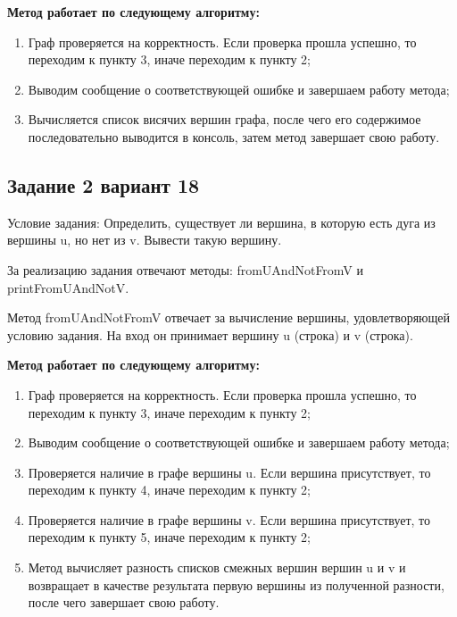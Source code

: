 \documentclass[bachelor, och, pract]{SCWorks}
\begin{document}
\textbf{Метод работает по следующему алгоритму:}

\begin{enumerate}
  \item {Граф проверяется на корректность. Если проверка прошла успешно,
  то переходим к пункту 3, иначе переходим к пункту 2;}
  \item {Выводим сообщение о соответствующей ошибке и завершаем работу метода;}
  \item {Вычисляется список висячих вершин графа, после чего его содержимое
  последовательно выводится в консоль, затем метод завершает свою работу.}
\end{enumerate}


\bigskip

\subsection{Задание 2 вариант 18}

Условие задания: Определить, существует ли вершина, в которую есть дуга из вершины u, но нет из v. Вывести такую вершину.
\bigskip

За реализацию задания отвечают методы: fromUAndNotFromV и printFromUAndNotV.
\bigskip

Метод fromUAndNotFromV отвечает за вычисление вершины, удовлетворяющей условию задания.
На вход он принимает вершину u (строка) и v (строка).
\smallskip

\textbf{Метод работает по следующему алгоритму:}

\begin{enumerate}
  \item {Граф проверяется на корректность. Если проверка прошла успешно,
  то переходим к пункту 3, иначе переходим к пункту 2;}
  \item {Выводим сообщение о соответствующей ошибке и завершаем работу метода;}
  \item {Проверяется наличие в графе вершины u. Если вершина присутствует, то переходим
  к пункту 4, иначе переходим к пункту 2;}
  \item {Проверяется наличие в графе вершины v. Если вершина присутствует, то переходим
  к пункту 5, иначе переходим к пункту 2;}
  \item {Метод вычисляет разность списков смежных вершин вершин u и v и возвращает
  в качестве результата первую вершины из полученной разности, после чего завершает свою работу.}
\end{enumerate}
\end{document}
